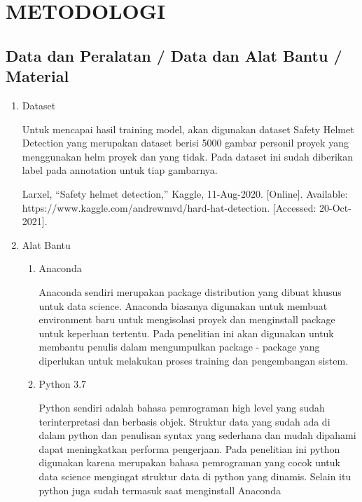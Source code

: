 \section{METODOLOGI}
\label{chap:desainimplementasi}



\subsection{Data dan Peralatan / Data dan Alat Bantu / Material}
\label{sec:perlengkapan}


\begin{enumerate}
  \item Dataset
  \par Untuk mencapai hasil training model, akan digunakan dataset Safety Helmet Detection yang merupakan dataset berisi 5000 gambar personil proyek yang menggunakan helm proyek dan yang tidak. Pada dataset ini sudah diberikan label pada annotation untuk tiap gambarnya. \cite{larxel_2020}
  \par Larxel, “Safety helmet detection,” Kaggle, 11-Aug-2020. [Online]. 
  Available: https://www.kaggle.com/andrewmvd/hard-hat-detection. [Accessed: 20-Oct-2021].

  \item Alat Bantu
  \begin{enumerate}
    \item Anaconda
    \par Anaconda sendiri merupakan package distribution yang dibuat khusus untuk data science. Anaconda biasanya digunakan untuk membuat environment baru untuk mengisolasi proyek dan menginstall package untuk keperluan tertentu. Pada penelitian ini akan digunakan untuk membantu penulis dalam mengumpulkan package - package yang diperlukan untuk melakukan proses training dan pengembangan sistem.\cite{pankajmathur_2018}

    \item Python 3.7
    \par Python sendiri adalah bahasa pemrograman high level yang sudah terinterpretasi dan berbasis objek. Struktur data yang sudah ada di dalam python dan penulisan syntax yang sederhana dan mudah dipahami dapat meningkatkan performa pengerjaan. Pada penelitian ini python digunakan karena merupakan bahasa pemrograman yang cocok untuk data science mengingat struktur data di python yang dinamis. Selain itu python juga sudah termasuk saat menginstall Anaconda \cite{python.org}


\end{enumerate}
\end{enumerate}
